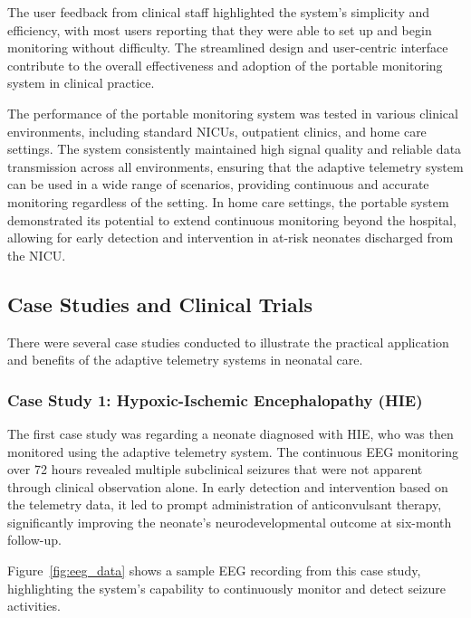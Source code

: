 \documentclass[12pt,journal,compsoc]{IEEEtran}
\begin{document}
The user feedback from clinical staff highlighted the system's simplicity and efficiency, with most users reporting that they were able to set up and begin monitoring without difficulty. The streamlined design and user-centric interface contribute to the overall effectiveness and adoption of the portable monitoring system in clinical practice.

The performance of the portable monitoring system was tested in various clinical environments, including standard NICUs, outpatient clinics, and home care settings. The system consistently maintained high signal quality and reliable data transmission across all environments, ensuring that the adaptive telemetry system can be used in a wide range of scenarios, providing continuous and accurate monitoring regardless of the setting. In home care settings, the portable system demonstrated its potential to extend continuous monitoring beyond the hospital, allowing for early detection and intervention in at-risk neonates discharged from the NICU.  

\subsection{Case Studies and Clinical Trials}

There were several case studies conducted to illustrate the practical application and benefits of the adaptive telemetry systems in neonatal care. 

\subsubsection{Case Study 1: Hypoxic-Ischemic Encephalopathy (HIE)}

The first case study was regarding a neonate diagnosed with HIE, who was then monitored using the adaptive telemetry system. The continuous EEG monitoring over 72 hours revealed multiple subclinical seizures that were not apparent through clinical observation alone. In early detection and intervention based on the telemetry data, it led to prompt administration of anticonvulsant therapy, significantly improving the neonate's neurodevelopmental outcome at six-month follow-up.

Figure~\ref{fig:eeg_data} shows a sample EEG recording from this case study, highlighting the system's capability to continuously monitor and detect seizure activities.
\end{document}
